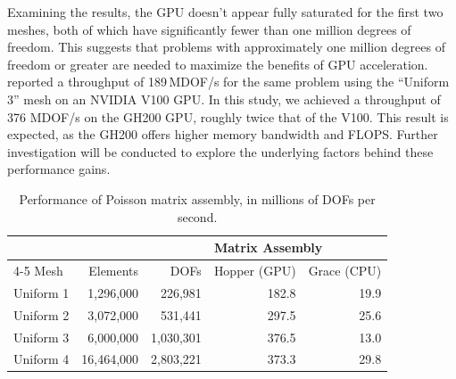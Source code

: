 Examining the results, the GPU doesn't appear fully saturated for the first two meshes, both of which have significantly fewer than one million degrees of freedom. This suggests that problems with approximately one million degrees of freedom or greater are needed to maximize the benefits of GPU acceleration. \citep{trotter2023targeting} reported a throughput of 189\,MDOF/s for the same problem using the ``Uniform 3'' mesh on an NVIDIA V100 GPU. In this study, we achieved a throughput of 376 MDOF/s on the GH200 GPU, roughly twice that of the V100. This result is expected, as the GH200 offers higher memory bandwidth and FLOPS. Further investigation will be conducted to explore the underlying factors behind these performance gains.

\begin{table}[t]
    \centering
\begin{tabular}{lrrrr}
\toprule
          &          &             & \multicolumn{2}{l}{Matrix Assembly} \\
                                     \cmidrule(lr){4-5}
Mesh      & Elements & DOFs        & Hopper (GPU) & Grace (CPU) \\
\midrule
Uniform 1 &  1,296,000 &   226,981 & 182.8 & 19.9 \\
Uniform 2 &  3,072,000 &   531,441 & 297.5 & 25.6 \\
Uniform 3 &  6,000,000 & 1,030,301 & 376.5 & 13.0 \\
Uniform 4 & 16,464,000 & 2,803,221 & 373.3 & 29.8 \\
\bottomrule
\end{tabular}
\caption{Performance of Poisson matrix assembly, in millions of DOFs per second.}
    \label{tab:poisson_results}
\end{table}

